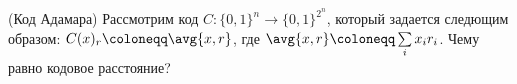 (Код Адамара) Рассмотрим код $C\colon \{0, 1\}^n \to \{0, 1\}^{2^n}$, который задается следющим образом:
$C(x)_r \coloneqq \avg{x, r}$, где $\avg{x, r} \coloneqq \sum\limits_i x_i r_i$. Чему равно кодовое
расстояние?